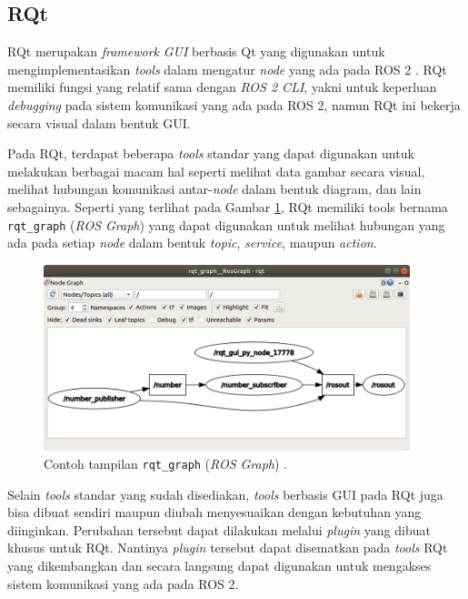 \subsection{RQt}
\label{subsec:rqt}

RQt merupakan \emph{framework} \emph{GUI} berbasis Qt \citep{url:qtframework} yang digunakan untuk mengimplementasikan \emph{tools} dalam mengatur \emph{node} yang ada pada ROS 2 \citep{url:rqtoverview}.
RQt memiliki fungsi yang relatif sama dengan \emph{ROS 2 CLI},
  yakni untuk keperluan \emph{debugging} pada sistem komunikasi yang ada pada ROS 2,
  namun RQt ini bekerja secara visual dalam bentuk GUI.

Pada RQt, terdapat beberapa \emph{tools} standar yang dapat digunakan untuk melakukan berbagai macam hal seperti melihat data gambar secara visual,
  melihat hubungan komunikasi antar-\emph{node} dalam bentuk diagram,
  dan lain sebagainya.
Seperti yang terlihat pada Gambar \ref{fig:contohrqtgraph},
  RQt memiliki tools bernama \lstinline{rqt_graph} (\emph{ROS Graph}) yang dapat digunakan untuk melihat hubungan yang ada pada setiap \emph{node} dalam bentuk \emph{topic}, \emph{service}, maupun \emph{action}.

\begin{figure}[ht]
  \centering
  \includegraphics[width=0.95\textwidth,keepaspectratio]{gambar/contoh-rqt-graph.png}
  \caption{Contoh tampilan \lstinline{rqt_graph} (\emph{ROS Graph}) \citep{url:rqtgraphexample}.}
  \label{fig:contohrqtgraph}
\end{figure}

Selain \emph{tools} standar yang sudah disediakan,
  \emph{tools} berbasis GUI pada RQt juga bisa dibuat sendiri maupun diubah menyesuaikan dengan kebutuhan yang diinginkan.
Perubahan tersebut dapat dilakukan melalui \emph{plugin} yang dibuat khusus untuk RQt.
Nantinya \emph{plugin} tersebut dapat disematkan pada \emph{tools} RQt yang dikembangkan dan secara langsung dapat digunakan untuk mengakses sistem komunikasi yang ada pada ROS 2.
